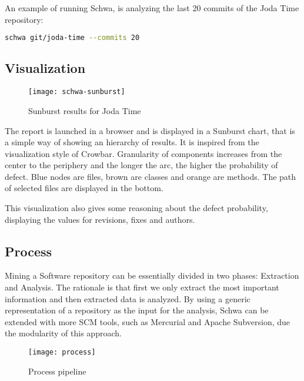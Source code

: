 An example of running Schwa, is analyzing the last 20 commits of the Joda Time repository:

\begin{lstlisting}[language=bash, caption=Running Schwa on Joda Time]
schwa git/joda-time --commits 20
\end{lstlisting}

\subsection{Visualization}

\begin{figure}[H]
    \begin{center}
        \texttt{[image: schwa-sunburst]}
        \caption{Sunburst results for Joda Time}
        \label{figure:sunburst-joda}
    \end{center}
\end{figure}

The report is launched in a browser and is displayed in a Sunburst chart, that is a simple way of showing an hierarchy of results. It is inspired from the visualization style of Crowbar. Granularity of components increases from the center to the periphery and the longer the arc, the higher the probability of defect. Blue nodes are files, brown are classes and orange are methods. The path of selected files are displayed in the bottom.

This visualization also gives some reasoning about the defect probability, displaying the values for revisions, fixes and authors.

\subsection{Process}
Mining a Software repository can be essentially divided in two phases: Extraction and Analysis. The rationale is that first we only extract the most important information and then extracted data is analyzed. By using a generic representation of a repository as the input for the analysis, Schwa can be extended with more SCM tools, such as Mercurial and Apache Subversion, due the modularity of this approach.


\begin{figure}[H]
    \begin{center}
        \texttt{[image: process]}
        \caption{Process pipeline}
        \label{figure:schwa_process}
    \end{center}
\end{figure}

